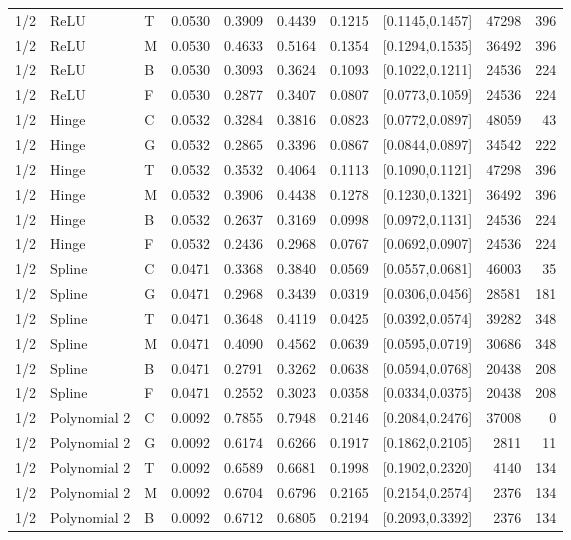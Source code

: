 \begin{longtable}{lllrrrrlrr}
1/2 & ReLU & T & 0.0530 & 0.3909 & 0.4439 & 0.1215 & [0.1145,0.1457] & 47298 & 396 \\
1/2 & ReLU & M & 0.0530 & 0.4633 & 0.5164 & 0.1354 & [0.1294,0.1535] & 36492 & 396 \\
1/2 & ReLU & B & 0.0530 & 0.3093 & 0.3624 & 0.1093 & [0.1022,0.1211] & 24536 & 224 \\
1/2 & ReLU & F & 0.0530 & 0.2877 & 0.3407 & 0.0807 & [0.0773,0.1059] & 24536 & 224 \\
1/2 & Hinge & C & 0.0532 & 0.3284 & 0.3816 & 0.0823 & [0.0772,0.0897] & 48059 & 43 \\
1/2 & Hinge & G & 0.0532 & 0.2865 & 0.3396 & 0.0867 & [0.0844,0.0897] & 34542 & 222 \\
1/2 & Hinge & T & 0.0532 & 0.3532 & 0.4064 & 0.1113 & [0.1090,0.1121] & 47298 & 396 \\
1/2 & Hinge & M & 0.0532 & 0.3906 & 0.4438 & 0.1278 & [0.1230,0.1321] & 36492 & 396 \\
1/2 & Hinge & B & 0.0532 & 0.2637 & 0.3169 & 0.0998 & [0.0972,0.1131] & 24536 & 224 \\
1/2 & Hinge & F & 0.0532 & 0.2436 & 0.2968 & 0.0767 & [0.0692,0.0907] & 24536 & 224 \\
1/2 & Spline & C & 0.0471 & 0.3368 & 0.3840 & 0.0569 & [0.0557,0.0681] & 46003 & 35 \\
1/2 & Spline & G & 0.0471 & 0.2968 & 0.3439 & 0.0319 & [0.0306,0.0456] & 28581 & 181 \\
1/2 & Spline & T & 0.0471 & 0.3648 & 0.4119 & 0.0425 & [0.0392,0.0574] & 39282 & 348 \\
1/2 & Spline & M & 0.0471 & 0.4090 & 0.4562 & 0.0639 & [0.0595,0.0719] & 30686 & 348 \\
1/2 & Spline & B & 0.0471 & 0.2791 & 0.3262 & 0.0638 & [0.0594,0.0768] & 20438 & 208 \\
1/2 & Spline & F & 0.0471 & 0.2552 & 0.3023 & 0.0358 & [0.0334,0.0375] & 20438 & 208 \\
1/2 & Polynomial 2 & C & 0.0092 & 0.7855 & 0.7948 & 0.2146 & [0.2084,0.2476] & 37008 & 0 \\
1/2 & Polynomial 2 & G & 0.0092 & 0.6174 & 0.6266 & 0.1917 & [0.1862,0.2105] & 2811 & 11 \\
1/2 & Polynomial 2 & T & 0.0092 & 0.6589 & 0.6681 & 0.1998 & [0.1902,0.2320] & 4140 & 134 \\
1/2 & Polynomial 2 & M & 0.0092 & 0.6704 & 0.6796 & 0.2165 & [0.2154,0.2574] & 2376 & 134 \\
1/2 & Polynomial 2 & B & 0.0092 & 0.6712 & 0.6805 & 0.2194 & [0.2093,0.3392] & 2376 & 134 \\

\end{longtable}
